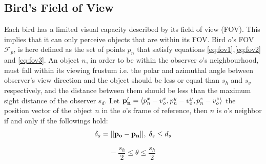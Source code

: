 \begin{itemize}
	
\end{itemize}


\subsection{Bird's Field of View}
Each bird has a limited visual capacity described by its field of view (FOV).
This implies that it can only perceive objects that are within its FOV. Bird
$o$'s FOV $\mathcal{F}_p$, is here defined as the set of points $p_n$ that
satisfy equations \ref{eq:fov1},\ref{eq:fov2} and \ref{eq:fov3}. An
object  $n$, in order to be within the  observer $o$'s neighbourhood,  must fall within
its viewing frustum i.e. the polar and azimuthal angle between observer's view
direction and the object should be less or equal than $s_h$ and $s_v$ respectively,
and the distance between them should be less than the maximum sight distance of the
observer $s_d$.
Let $\vb{p'_n}=\expval{p^x_n-v^x_o,p^y_n-v^y_o,p^z_n-v^z_o}$ the position vector of the object $n$ in the $o$'s frame of reference, then $n$ is $o$'s neighbor if and only if the followings hold:
\begin{equation}
\label{eq:fov1}
\delta_s = || \vb{p_o} - \vb{p_n} ||,\; \delta_s \leq d_s 
\end{equation}

\begin{equation}
\label{eq:fov2}
- \; \frac{s_h}{2} \leq \theta \leq \frac{s_h}{2}
\end{equation}

